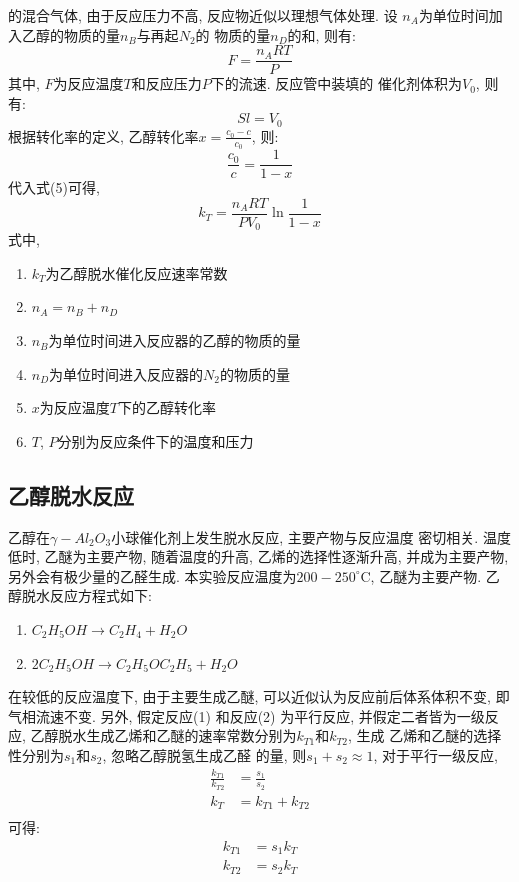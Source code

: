 \documentclass[a4paper]{article}
\begin{document}
的混合气体, 由于反应压力不高, 反应物近似以理想气体处理. 设
$n_{A}$为单位时间加入乙醇的物质的量$n_{B}$与再起$N_{2}$的
物质的量$n_{D}$的和, 则有:
\begin{equation}
F = \frac{n_{A}RT}{P}
\end{equation}
其中, $F$为反应温度$T$和反应压力$P$下的流速. 反应管中装填的
催化剂体积为$V_{0}$, 则有:
\begin{equation}
Sl = V_{0}
\end{equation}
根据转化率的定义, 乙醇转化率$x = \frac{c_{0}-c}{c_{0}}$, 则:
\begin{equation}
\frac{c_{0}}{c} = \frac{1}{1-x}
\end{equation}
代入式(5)可得, 
\begin{equation}
k_{T} = \frac{n_{A}RT}{PV_{0}}\ln\frac{1}{1-x}
\end{equation}
式中, 
\begin{enumerate}
	\item[] $k_{T}$为乙醇脱水催化反应速率常数
	\item[] $n_{A} = n_{B} + n_{D}$
	\item[] $n_{B}$为单位时间进入反应器的乙醇的物质的量
	\item[] $n_{D}$为单位时间进入反应器的$N_{2}$的物质的量
	\item[] $x$为反应温度$T$下的乙醇转化率
	\item[] $T$, $P$分别为反应条件下的温度和压力
\end{enumerate}
\subsection{乙醇脱水反应}
乙醇在$\gamma-Al_2O_3$小球催化剂上发生脱水反应, 主要产物与反应温度
密切相关. 温度低时, 乙醚为主要产物, 随着温度的升高, 
乙烯的选择性逐渐升高, 并成为主要产物, 另外会有极少量的乙醛生成. 
本实验反应温度为$200-250^\circ$C, 乙醚为主要产物. 
乙醇脱水反应方程式如下: 
\begin{enumerate}
	\item $C_{2}H_{5}OH \to C_{2}H_{4} + H_{2}O$
	\item $2C_{2}H_{5}OH \to C_{2}H_{5}OC_{2}H_{5} + H_{2}O$
\end{enumerate}
\par
在较低的反应温度下, 由于主要生成乙醚, 
可以近似认为反应前后体系体积不变, 即气相流速不变. 
另外, 假定反应(1) 和反应(2) 为平行反应, 并假定二者皆为一级反应, 
乙醇脱水生成乙烯和乙醚的速率常数分别为$k_{T1}$和$k_{T2}$, 生成
乙烯和乙醚的选择性分别为$s_{1}$和$s_{2}$, 忽略乙醇脱氢生成乙醛
的量, 则$s_{1}+s_{2}\approx 1$, 对于平行一级反应,
\begin{equation}
	\begin{aligned}
		\frac{k_{T1}}{k_{T2}} &= \frac{s_{1}}{s_{2}}\\
		k_{T} &= k_{T1} + k_{T2}\\
	\end{aligned}
\end{equation}
可得:
\begin{equation}
	\begin{aligned}
		k_{T1} &= s_{1}k_{T}\\
		k_{T2} &= s_{2}k_{T}\\
	\end{aligned}
\end{equation}
\end{document}
